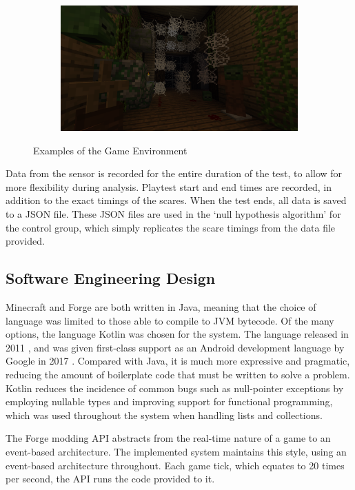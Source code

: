 \documentclass[12pt,a4paper]{article}\usepackage[]{graphicx}\usepackage[]{color}
\begin{document}
\begin{figure}[htb]
\begin{subfigure}[t]{.495\linewidth}
	\end{subfigure}
	\begin{subfigure}[t]{.495\linewidth}
		\centering
		\includegraphics[width=\textwidth]{images/environment4.png}
	\end{subfigure}
	\caption{Examples of the Game Environment}
	\label{fig:GameEnvironment}
\end{figure}


Data from the sensor is recorded for the entire duration of the test, to allow for more flexibility during analysis.
Playtest start and end times are recorded, in addition to the exact timings of the scares.
When the test ends, all data is saved to a JSON file.
These JSON files are used in the `null hypothesis algorithm' for the control group, which simply replicates the scare timings from the data file provided.

\subsection{Software Engineering Design}
Minecraft and Forge are both written in Java, meaning that the choice of language was limited to those able to compile to JVM bytecode.
Of the many options, the language Kotlin was chosen for the system.
The language released in 2011 \cite{kotlinRelease}, and was given first-class support as an Android development language by Google in 2017 \cite{googleKotlin}.
Compared with Java, it is much more expressive and pragmatic, reducing the amount of boilerplate code that must be written to solve a problem.
Kotlin reduces the incidence of common bugs such as null-pointer exceptions by employing nullable types and improving support for functional programming, which was used throughout the system when handling lists and collections.

The Forge modding API abstracts from the real-time nature of a game to an event-based architecture.
The implemented system maintains this style, using an event-based architecture throughout.
Each game tick, which equates to 20 times per second, the API runs the code provided to it.
\end{document}

